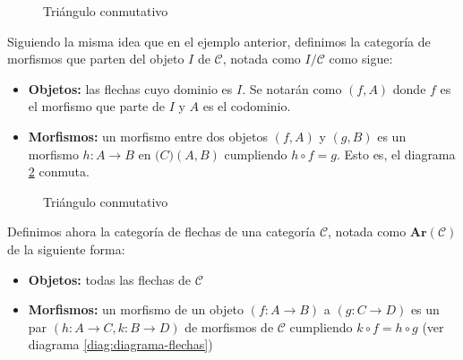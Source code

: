 \begin{figure}[htpb]
    \centering
    \caption{Triángulo conmutativo}
    \label{diag:traingulo_hacia}
\end{figure}

\begin{ejemplo}
    Siguiendo la misma idea que en el ejemplo anterior, definimos la categoría de morfismos que parten del objeto $I$ de $\mathscr{C}$, notada como $I / \mathscr{C}$ como sigue: 
    \begin{itemize}
        \item \textbf{Objetos: } las flechas cuyo dominio es $I$. Se notarán como $(f,A)$ donde $f$ es el morfismo que parte de $I$ y $A$ es el codominio.
        
        \item \textbf{Morfismos: } un morfismo entre dos objetos $(f,A)$ y $(g,B)$ es un morfismo $h: A \longrightarrow B$ en $\mathscr(C)(A,B)$ cumpliendo $h \circ f = g$. Esto es, el diagrama \ref{diag:traingulo_desde} conmuta.
    \end{itemize}
\end{ejemplo}

\begin{figure}[htpb]
    \centering
    \caption{Triángulo conmutativo}
    \label{diag:traingulo_desde}
\end{figure}

\begin{ejemplo}
    Definimos ahora la categoría de flechas de una categoría $\mathscr{C}$, notada como $\textbf{Ar}(\mathscr{C})$ de la siguiente forma:
    \begin{itemize}
        \item \textbf{Objetos: } todas las flechas de $\mathscr{C}$
        \item \textbf{Morfismos: } un morfismo de un objeto $(f: A \longrightarrow B)$ a $(g: C \longrightarrow D)$ es un par $(h: A \longrightarrow C, k: B \longrightarrow D)$ de morfismos de $\mathscr{C}$ cumpliendo $k \circ f = h \circ g$ (ver diagrama \ref{diag:diagrama-flechas})
    \end{itemize}
\end{ejemplo}

